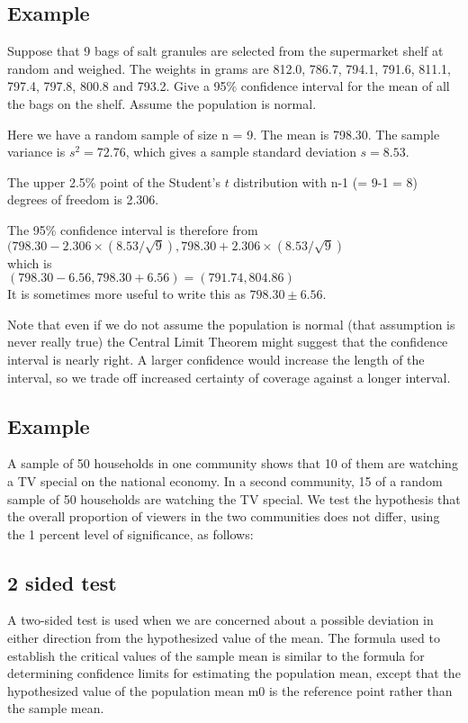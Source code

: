 \documentclass[12pt, a4paper]{report}
\theoremstyle{plain}
\theoremstyle{definition}
\theoremstyle{remark}
\begin{document}
\subsection{Example}
Suppose that 9 bags of salt granules are selected from the supermarket
shelf at random and weighed. The weights in grams are 812.0, 786.7, 794.1,
791.6, 811.1, 797.4, 797.8, 800.8 and 793.2. Give a 95\% confidence interval for the
mean of all the bags on the shelf. Assume the population is normal.


Here we have a random sample of size n = 9. The mean is 798.30. The sample
variance is $s^2 = 72.76$, which gives a sample standard deviation $s = 8.53$.

The upper 2.5\% point of the Student's $t$ distribution with n-1 (= 9-1 = 8) degrees of freedom is 2.306.

The 95\% confidence interval is therefore from \\
$(798.30 - 2.306 \times (8.53/\sqrt{9}), 798.30 + 2.306 \times (8.53/\sqrt{9})$\\
which is\\
$(798.30 - 6.56, 798.30 + 6.56) = (791.74, 804.86)$\\
It is sometimes more useful to write this as $798.30 \pm 6.56$.

Note that even if we do not assume the population is normal (that assumption is
never really true) the Central Limit Theorem might suggest that the confidence interval
is nearly right. A larger confidence would increase the length of the interval, so we
trade off increased certainty of coverage against a longer interval.

\subsection{Example} A sample of 50 households in one community
shows that 10 of them are watching a TV special on the national
economy. In a second community, 15 of a random sample of 50
households are watching the TV special. We test the hypothesis
that the overall proportion of viewers in the two communities does
not differ, using the 1 percent level of significance, as follows:

\subsection{2 sided test}
A two-sided test is used when we are concerned about a possible
deviation in either direction from the hypothesized value of the
mean. The formula used to establish the critical values of the
sample mean is similar to the formula for determining confidence
limits for estimating the population mean, except that the
hypothesized value of the population mean m0 is the reference
point rather than the sample mean.
\end{document}
